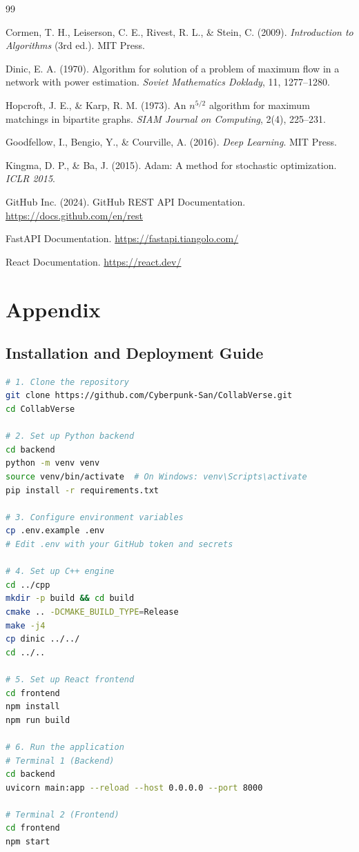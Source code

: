 \documentclass[12pt,a4paper]{article}
\begin{document}
\newpage
\begin{thebibliography}{99}

Cormen, T. H., Leiserson, C. E., Rivest, R. L., \& Stein, C. (2009).
\emph{Introduction to Algorithms} (3rd ed.). MIT Press.

Dinic, E. A. (1970).
Algorithm for solution of a problem of maximum flow in a network with power estimation.
\emph{Soviet Mathematics Doklady}, 11, 1277–1280.

Hopcroft, J. E., \& Karp, R. M. (1973).
An \(n^{5/2}\) algorithm for maximum matchings in bipartite graphs.
\emph{SIAM Journal on Computing}, 2(4), 225–231.

Goodfellow, I., Bengio, Y., \& Courville, A. (2016).
\emph{Deep Learning}. MIT Press.

Kingma, D. P., \& Ba, J. (2015).
Adam: A method for stochastic optimization.
\emph{ICLR 2015}.

GitHub Inc. (2024).
GitHub REST API Documentation.
\url{https://docs.github.com/en/rest}

FastAPI Documentation.
\url{https://fastapi.tiangolo.com/}

React Documentation.
\url{https://react.dev/}

\end{thebibliography}

\newpage
\appendix
\section{Appendix}

\subsection{Installation and Deployment Guide}

\begin{lstlisting}[language=bash, caption=Complete Installation Guide]
# 1. Clone the repository
git clone https://github.com/Cyberpunk-San/CollabVerse.git
cd CollabVerse

# 2. Set up Python backend
cd backend
python -m venv venv
source venv/bin/activate  # On Windows: venv\Scripts\activate
pip install -r requirements.txt

# 3. Configure environment variables
cp .env.example .env
# Edit .env with your GitHub token and secrets

# 4. Set up C++ engine
cd ../cpp
mkdir -p build && cd build
cmake .. -DCMAKE_BUILD_TYPE=Release
make -j4
cp dinic ../../
cd ../..

# 5. Set up React frontend
cd frontend
npm install
npm run build

# 6. Run the application
# Terminal 1 (Backend)
cd backend
uvicorn main:app --reload --host 0.0.0.0 --port 8000

# Terminal 2 (Frontend)
cd frontend
npm start
\end{lstlisting}
\end{document}
